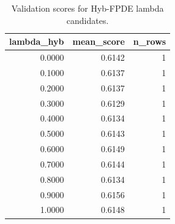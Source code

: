 \begin{table}[t]
\caption{Validation scores for Hyb-FPDE lambda candidates.}
\label{tab:lambda_distribution_computed}
\centering
\begin{tabular}{rrr}
\toprule
lambda\_hyb & mean\_score & n\_rows \\
\midrule
0.0000 & 0.6142 & 1 \\
0.1000 & 0.6137 & 1 \\
0.2000 & 0.6137 & 1 \\
0.3000 & 0.6129 & 1 \\
0.4000 & 0.6134 & 1 \\
0.5000 & 0.6143 & 1 \\
0.6000 & 0.6149 & 1 \\
0.7000 & 0.6144 & 1 \\
0.8000 & 0.6134 & 1 \\
0.9000 & 0.6156 & 1 \\
1.0000 & 0.6148 & 1 \\
\bottomrule
\end{tabular}

\end{table}
